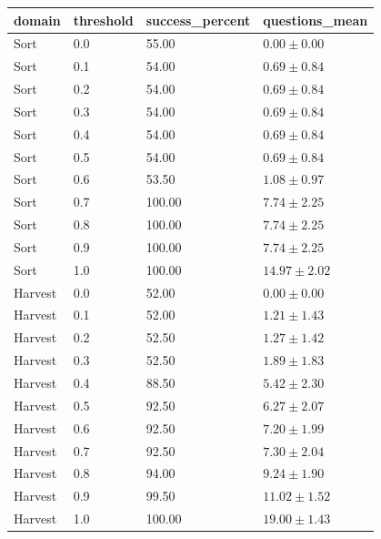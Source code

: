 \begin{tabular}{llll}
\hline
domain & threshold & success\_percent & questions\_mean \\
\hline
Sort & 0.0 & 55.00 & $0.00 \pm 0.00$ \\
Sort & 0.1 & 54.00 & $0.69 \pm 0.84$ \\
Sort & 0.2 & 54.00 & $0.69 \pm 0.84$ \\
Sort & 0.3 & 54.00 & $0.69 \pm 0.84$ \\
Sort & 0.4 & 54.00 & $0.69 \pm 0.84$ \\
Sort & 0.5 & 54.00 & $0.69 \pm 0.84$ \\
Sort & 0.6 & 53.50 & $1.08 \pm 0.97$ \\
Sort & 0.7 & 100.00 & $7.74 \pm 2.25$ \\
Sort & 0.8 & 100.00 & $7.74 \pm 2.25$ \\
Sort & 0.9 & 100.00 & $7.74 \pm 2.25$ \\
Sort & 1.0 & 100.00 & $14.97 \pm 2.02$ \\
Harvest & 0.0 & 52.00 & $0.00 \pm 0.00$ \\
Harvest & 0.1 & 52.00 & $1.21 \pm 1.43$ \\
Harvest & 0.2 & 52.50 & $1.27 \pm 1.42$ \\
Harvest & 0.3 & 52.50 & $1.89 \pm 1.83$ \\
Harvest & 0.4 & 88.50 & $5.42 \pm 2.30$ \\
Harvest & 0.5 & 92.50 & $6.27 \pm 2.07$ \\
Harvest & 0.6 & 92.50 & $7.20 \pm 1.99$ \\
Harvest & 0.7 & 92.50 & $7.30 \pm 2.04$ \\
Harvest & 0.8 & 94.00 & $9.24 \pm 1.90$ \\
Harvest & 0.9 & 99.50 & $11.02 \pm 1.52$ \\
Harvest & 1.0 & 100.00 & $19.00 \pm 1.43$ \\
\hline
\end{tabular}
